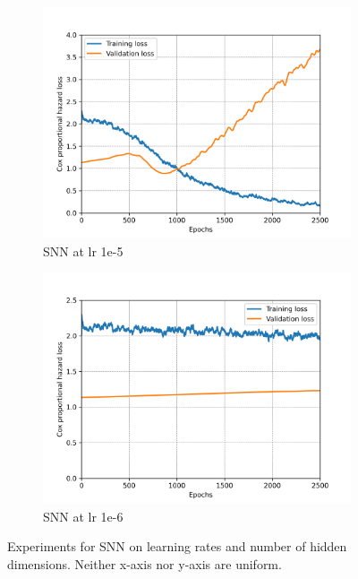 \begin{figure}[h!t]
\begin{subfigure}[b]{0.49\textwidth}
         \centering
         \includegraphics[width=\textwidth]{latex/loss_plots/SNNet_fsz250_1e-5_2500epochs.png}
         \caption{SNN at lr 1e-5}
     \end{subfigure}
    \hfill
     \begin{subfigure}[b]{0.49\textwidth}
         \centering
         \includegraphics[width=\textwidth]{latex/loss_plots/SNNet_fsz250_1e-6_2500epochs.png}
         \caption{SNN at lr 1e-6}
     \end{subfigure}
    \hfill
    \caption[SNN with varying learning rates and models]{Experiments for SNN on learning rates and number of hidden dimensions. Neither x-axis nor y-axis are uniform.}
    \label{fig:snn_lr_loss}
\end{figure}

